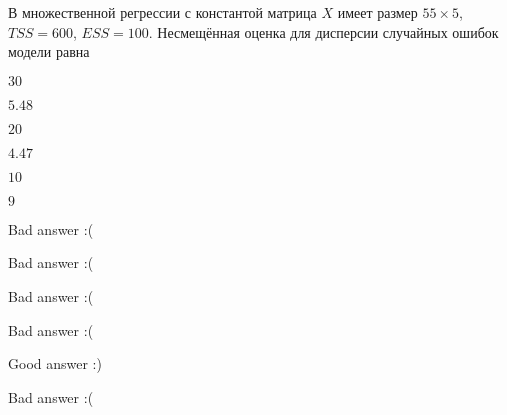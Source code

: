 
\begin{question}
В множественной регрессии с константой матрица \(X\) имеет размер
\(55 \times 5\), \(TSS=600\), \(ESS=100\).
Несмещённая оценка для дисперсии случайных ошибок модели равна
\begin{answerlist}
  \item \(30\)
  \item \(5.48\)
  \item \(20\)
  \item \(4.47\)
  \item \(10\)
  \item \(9\)
\end{answerlist}
\end{question}

\begin{solution}
\begin{answerlist}
  \item Bad answer :(
  \item Bad answer :(
  \item Bad answer :(
  \item Bad answer :(
  \item Good answer :)
  \item Bad answer :(
\end{answerlist}
\end{solution}

